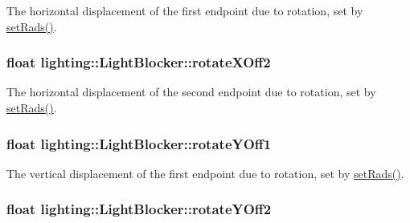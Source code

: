 The horizontal displacement of the first endpoint due to rotation, set by \hyperlink{classlighting_1_1LightBlocker_a1fe1c13013aeee813526ae74cd5a984c}{set\+Rads()}. 

\subsubsection[{\texorpdfstring{rotate\+X\+Off2}{rotateXOff2}}]{\setlength{\rightskip}{0pt plus 5cm}float lighting\+::\+Light\+Blocker\+::rotate\+X\+Off2}\hypertarget{classlighting_1_1LightBlocker_a5e08ff3bf8f8f26b8660f95114184b5c}{}\label{classlighting_1_1LightBlocker_a5e08ff3bf8f8f26b8660f95114184b5c}


The horizontal displacement of the second endpoint due to rotation, set by \hyperlink{classlighting_1_1LightBlocker_a1fe1c13013aeee813526ae74cd5a984c}{set\+Rads()}. 

\subsubsection[{\texorpdfstring{rotate\+Y\+Off1}{rotateYOff1}}]{\setlength{\rightskip}{0pt plus 5cm}float lighting\+::\+Light\+Blocker\+::rotate\+Y\+Off1}\hypertarget{classlighting_1_1LightBlocker_a3c9c30ae0058e5f97b13c785f9ab879a}{}\label{classlighting_1_1LightBlocker_a3c9c30ae0058e5f97b13c785f9ab879a}


The vertical displacement of the first endpoint due to rotation, set by \hyperlink{classlighting_1_1LightBlocker_a1fe1c13013aeee813526ae74cd5a984c}{set\+Rads()}. 

\subsubsection[{\texorpdfstring{rotate\+Y\+Off2}{rotateYOff2}}]{\setlength{\rightskip}{0pt plus 5cm}float lighting\+::\+Light\+Blocker\+::rotate\+Y\+Off2}\hypertarget{classlighting_1_1LightBlocker_aea5301a408a819c955c9227ff6a41009}{}\label{classlighting_1_1LightBlocker_aea5301a408a819c955c9227ff6a41009}



